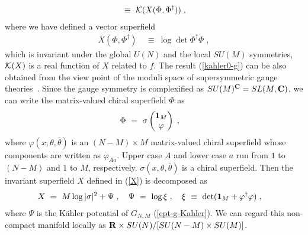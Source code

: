 \documentclass[a4paper,11pt]{article}
\newcommand{\kahler}{K\"{a}hler }
\newcommand{\bsubeq}{\begin{subequations}}
\newcommand{\esubeq}{\end{subequations}}
\begin{document}
{\begin{align}
\ \equiv \
{\cal K} (X (\Phi, \Phi^{\dagger})) \; , 
\label{kahler0-g}
\end{align}
where we have defined a vector superfield 
\begin{align}
 X (\Phi, \Phi^{\dagger}) 
 \ &\equiv \ 
 \log \det \Phi^{\dagger} \Phi \; , \label{X}
\end{align}
which is invariant under 
the global $U(N)$ and the local $SU(M)$ symmetries, 
${\cal K}(X)$ is a real function of $X$ related to $f$. 
The result (\ref{kahler0-g}) can be also obtained from the 
view point of the moduli space of 
supersymmetric gauge theories~\cite{HKLR,LT}. 
Since the gauge symmetry is complexified as 
$SU(M)^{\bf C} = SL(M, {\bf C})$,
we can write the matrix-valued chiral superfield $\Phi$ as
\begin{align}
\Phi \ &= \ \sigma \begin{pmatrix}
  {\bf 1}_M \cr
  \varphi
 \end{pmatrix} \; , \label{gf-Phi-g}
\end{align}
where
$\varphi (x, \theta , \bar{\theta})$ is an $(N-M) \times M$
matrix-valued chiral superfield whose components are written as
$\varphi_{A a}$.
Upper case $A$ and lower case $a$ run from 
$1$ to $(N-M)$ and $1$ to $M$, respectively. 
$\sigma (x, \theta, \bar{\theta})$ is a chiral superfield.
Then the invariant superfield $X$ defined in 
(\ref{X}) is decomposed as
\bsubeq \label{xi-g}
\begin{align}
X \ &= \ 
M \log |\sigma|^2 + \Psi \; , \ \ \ 
\Psi \ = \ \log \xi \; , \ \ \ 
\xi 
\ \equiv \
\det ({\bf 1}_M + \varphi^{\dagger}\varphi)  \;, 
\end{align}
\esubeq
where $\Psi$ is the \kahler potential of 
$G_{N,M}$ (\ref{cpt-g-Kahler}).
We can regard this non-compact manifold locally as 
${\bf R} \times SU(N)/[SU(N-M) \times SU(M)]$.

}
\end{document}
